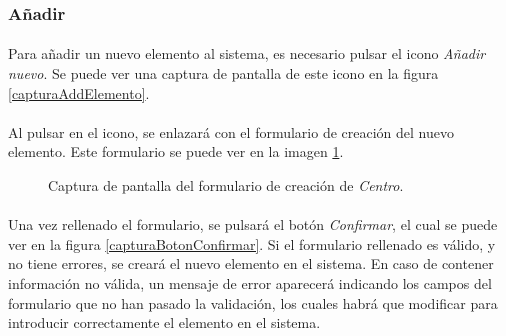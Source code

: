 \subsubsection{Añadir}\label{addCentro}

  \paragraph{}Para añadir un nuevo elemento al sistema, es necesario pulsar el
  icono \textit{Añadir nuevo}. Se puede ver una captura de pantalla de este
  icono en la figura \ref{capturaAddElemento}.

  \paragraph{}Al pulsar en el icono, se enlazará con el formulario de creación
  del nuevo elemento. Este formulario se puede ver en la imagen
  \ref{capturaAddCentro}.

  \begin{figure}[!ht]
    \begin{center}
      \caption{Captura de pantalla del formulario de creación de \textit{Centro}.}
      \label{capturaAddCentro}
    \end{center}
  \end{figure}

  \paragraph{}Una vez rellenado el formulario, se pulsará el botón
  \textit{Confirmar}, el cual se puede ver en la figura
  \ref{capturaBotonConfirmar}. Si el formulario rellenado es válido, y no tiene
  errores, se creará el nuevo elemento en el sistema. En caso de contener
  información no válida, un mensaje de error aparecerá indicando los campos
  del formulario que no han pasado la validación, los cuales habrá que modificar
  para introducir correctamente el elemento en el sistema.

